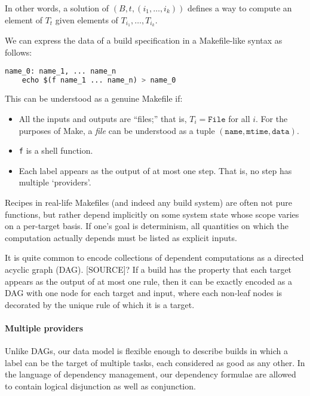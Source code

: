 In other words, a solution of \((B,t,(i_1,\ldots,i_k))\) defines a way to compute an element of \(T_t\) given elements of \(T_{i_1},\ldots,T_{i_k}\).

\begin{example}
  We can express the data of a build specification in a Makefile-like syntax as follows:

  
\begin{lstlisting}[language=Python]
name_0: name_1, ... name_n
    echo $(f name_1 ... name_n) > name_0
\end{lstlisting}

This can be understood as a genuine Makefile if:

\begin{itemize}
\item
  All the inputs and outputs are ``files;'' that is, \(T_i=\mathtt{File}\) for all \(i\). 
  For the purposes of Make, a \emph{file} can be understood as a tuple \((\mathtt{name},\mathtt{mtime}, \mathtt{data})\).
\item
  \texttt{f} is a shell function.
\item
  Each label appears as the output of at most one step. That is, no step has multiple `providers'.
\end{itemize}

  Recipes in real-life Makefiles (and indeed any build system) are often not pure functions, but rather depend implicitly on some system state whose scope varies on a per-target basis. 
  If one's goal is determinism, all quantities on which the computation actually depends must be listed as explicit inputs.
\end{example}

\begin{example} 
  
  It is quite common to encode collections of dependent computations as a directed acyclic graph (DAG). [SOURCE]?
  If a build has the property that each target appears as the output of at most one rule, then it can be exactly encoded as a DAG with one node for each target and input, where each non-leaf nodes is decorated by the unique rule of which it is a target.

\end{example}

\paragraph{Multiple providers}
%
Unlike DAGs, our data model is flexible enough to describe builds in which a label can be the target of multiple tasks, each considered as good as any other.
%
In the language of dependency management, our dependency formulae are allowed to contain logical disjunction as well as conjunction.

